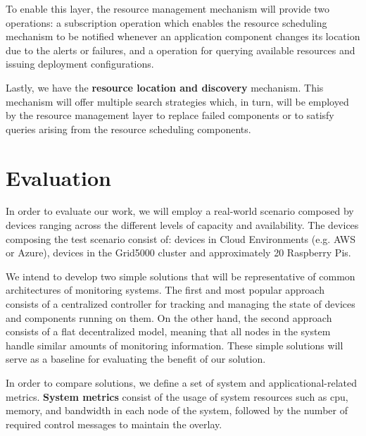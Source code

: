 
To enable this layer, the resource management mechanism will provide two operations: a subscription operation which enables the resource scheduling mechanism to be notified whenever an application component changes its location due to the alerts or failures, and a operation for querying available resources and issuing deployment configurations. 

Lastly, we have the \textbf{resource location and discovery} mechanism. This mechanism will offer multiple search strategies which, in turn, will be employed by the resource management layer to replace failed components or to satisfy queries arising from the resource scheduling components.

\section{Evaluation}  

In order to evaluate our work, we will employ a real-world scenario composed by devices ranging across the different levels of capacity and availability. The devices composing the test scenario consist of: devices in Cloud Environments (e.g. AWS or Azure), devices in the Grid5000 cluster and approximately 20 Raspberry Pis.

We intend to develop two simple solutions 
that will be representative of common architectures of monitoring systems. The first and most popular approach consists of a centralized controller for tracking and managing the state of devices and components running on them. %
On the other hand, the second approach consists of a flat decentralized model, 
meaning that all nodes in the system handle similar amounts of monitoring information. These simple solutions will serve as a baseline for evaluating the benefit of our solution.

In order to compare solutions, we define a set of system and applicational-related metrics. \textbf{System metrics} consist of the usage of system resources such as cpu, memory, and bandwidth in each node of the system, followed by the number of required control messages to maintain the overlay.


